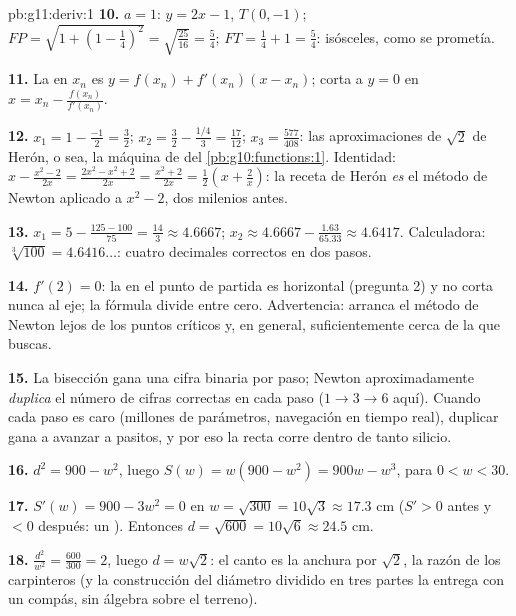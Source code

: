 \begin{solution}{pb:g11:deriv:1}
\textbf{10.} $a = 1$:  $y = 2x - 1$, $T(0, -1)$;
$FP = \sqrt{1 + \left(1 - \frac14\right)^2} = \sqrt{\frac{25}{16}} =
\frac54$; $FT = \frac14 + 1 = \frac54$: isósceles, como se prometía.

\textbf{11.} La  en $x_n$ es $y = f(x_n) + f'(x_n)(x - x_n)$;
corta a $y = 0$ en $x = x_n - \frac{f(x_n)}{f'(x_n)}$.

\textbf{12.} $x_1 = 1 - \frac{-1}{2} = \frac32$;
$x_2 = \frac32 - \frac{1/4}{3} = \frac{17}{12}$;
$x_3 = \frac{577}{408}$: las aproximaciones de $\sqrt2$ de Herón, o sea,
la máquina de  del \cref{pb:g10:functions:1}. Identidad:
$x - \frac{x^2 - 2}{2x} = \frac{2x^2 - x^2 + 2}{2x}
= \frac{x^2 + 2}{2x} = \frac12\left(x + \frac2x\right)$: la receta de
Herón \emph{es} el método de Newton aplicado a $x^2 - 2$, dos milenios
antes.

\textbf{13.} $x_1 = 5 - \frac{125 - 100}{75} = \frac{14}{3} \approx
4.6667$; $x_2 \approx 4.6667 - \frac{1.63}{65.33} \approx 4.6417$.
Calculadora: $\sqrt[3]{100} = 4.6416\ldots$: cuatro decimales correctos en
dos pasos.

\textbf{14.} $f'(2) = 0$: la  en el punto de partida es horizontal
(pregunta 2) y no corta nunca al eje; la fórmula divide entre cero.
Advertencia: arranca el método de Newton lejos de los puntos críticos y,
en general, suficientemente cerca de la  que buscas.

\textbf{15.} La bisección gana una cifra binaria por paso; Newton
aproximadamente \emph{duplica} el número de cifras correctas en cada paso
($1 \to 3 \to 6$ aquí). Cuando cada paso es caro (millones de parámetros,
navegación en tiempo real), duplicar gana a avanzar a pasitos, y por eso
la recta  corre dentro de tanto silicio.

\textbf{16.} $d^2 = 900 - w^2$, luego $S(w) = w(900 - w^2) = 900w - w^3$,
para $0 < w < 30$.

\textbf{17.} $S'(w) = 900 - 3w^2 = 0$ en $w = \sqrt{300} = 10\sqrt3
\approx 17.3$ cm ($S' > 0$ antes y $< 0$ después: un ). Entonces
$d = \sqrt{600} = 10\sqrt6 \approx 24.5$ cm.

\textbf{18.} $\frac{d^2}{w^2} = \frac{600}{300} = 2$, luego
$d = w\sqrt2$: el canto es la anchura por $\sqrt2$, la razón de los
carpinteros (y la construcción del diámetro dividido en tres partes la
entrega con un compás, sin álgebra sobre el terreno).


\end{solution}
